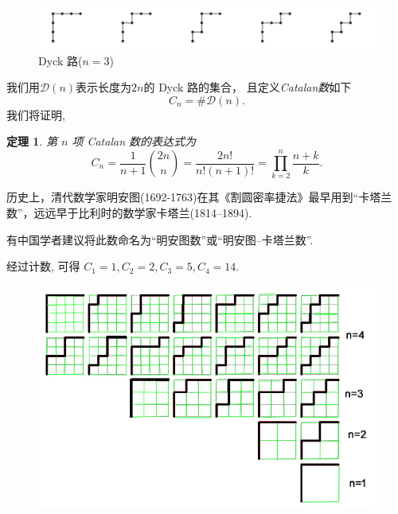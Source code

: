 \documentclass[punct]{beamer}
\newtheorem{thm}{定理}
\newtheorem{defi}[thm]{定义}
\begin{document}
\begin{frame}
%
\begin{figure}[h]
	\centering
	\includegraphics[width=0.9\linewidth]{n-Dyck-path.jpg}
	\caption{Dyck 路($n=3$)}
\end{figure}

我们用$\mathcal{D}(n)$表示长度为$2n$的 Dyck 路的集合， 且定义\textsl{Catalan数}如下
$$
C_n =\# \mathcal{D}(n).
$$
我们将证明,
\begin{thm}
第 $n$ 项 Catalan 数的表达式为
$$C_{n}=\frac{1}{n+1}{2n\choose n}=\frac{2 n !}{n !(n+1) !}=\prod_{k=2}^n \frac{n+k}{k}.$$
\end{thm}




历史上，清代数学家明安图(1692-1763)在其《割圆密率捷法》最早用到“卡塔兰数”，远远早于比利时的数学家卡塔兰(1814–1894).

有中国学者建议将此数命名为“明安图数”或“明安图--卡塔兰数”.


\end{frame}


\begin{frame}
    经过计数, 可得
    $C_{1}=1, C_{2}=2, C_{3}=5,
    C_{4}=14$.

    \begin{figure}[h]
        \centering
        \includegraphics[width=0.95\linewidth]{Dyck-4.jpeg}
    \end{figure}
\end{frame}
\end{document}
